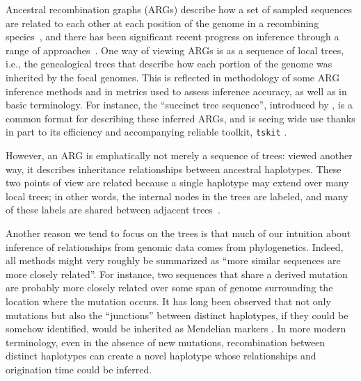 \documentclass[10pt,twoside,lineno]{gsajnl}
\newcommand{\tskit}{\texttt{tskit}}
\begin{document}
Ancestral recombination graphs (ARGs) describe how a set of sampled sequences 
are related to each other at each position of the genome in a recombining
species~\citep{brandt2024promise,lewanski2024introduction,nielsen2024inference,
wong2024general}, and there has been significant recent progress 
on inference through a range of approaches~\citep{rasmussen2014genome,
speidel2019method,kelleher2019inferring,zhang2023biobankscale,deng2024robust}.
One way of viewing ARGs is as a sequence of local trees,
i.e., the genealogical trees that describe how each portion of the genome
was inherited by the focal genomes.
This is reflected in methodology of some ARG inference methods
and in metrics used to assess inference accuracy,
as well as in basic terminology.
For instance, 
the ``succinct tree sequence'',
introduced by \citet{kelleher2016efficient},
is a common format for describing these inferred ARGs,
and is seeing wide use thanks in part to its efficiency and accompanying reliable toolkit,
\tskit{} \citep{tskit,ralph2020efficiently}.

However, an ARG is emphatically not merely a sequence of trees:
viewed another way, it describes inheritance relationships between ancestral haplotypes.
These two points of view are related because a single haplotype
may extend over many local trees;
in other words, the internal nodes in the trees are labeled, and many of these labels
are shared between adjacent trees~\citep{wong2024general}.

Another reason we tend to focus on the trees is that
much of our intuition about inference of relationships from genomic data
comes from phylogenetics.
Indeed, all methods might very roughly be summarized as
``more similar sequences are more closely related''.
For instance, two sequences that share a derived mutation
are probably more closely related over some span of genome surrounding the location where the mutation occurs.
It has long been observed 
that not only mutations
but also the ``junctions'' between distinct haplotypes,
if they could be somehow identified,
would be inherited as Mendelian markers
\citep{fisher1954fuller,chapman2003model}.
In more modern terminology, 
even in the absence of new mutations,
recombination between distinct haplotypes can create a novel haplotype
whose relationships and origination time could be inferred.
\end{document}
